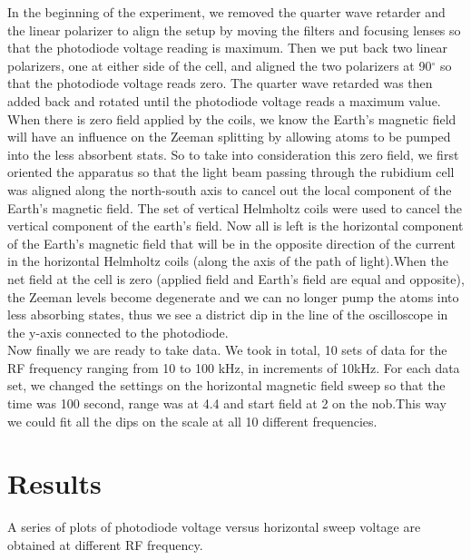 \documentclass[prb,preprint]{revtex4-1}
\begin{document}
In the beginning of the experiment, we removed the quarter wave retarder and the linear polarizer to align the setup by moving the filters and focusing lenses so that the photodiode voltage reading is maximum. Then we put back two linear polarizers, one at either side of the cell, and aligned the two polarizers at 90$^{\circ}$ so that the photodiode voltage reads zero. The quarter wave retarded was then added back and rotated until the photodiode voltage reads a maximum value.\\

When there is zero field applied by the coils, we know the Earth's magnetic field will have an influence on the Zeeman splitting by allowing atoms to be pumped into the less absorbent stats. So to take into consideration this zero field, we first oriented the apparatus so that the light beam passing through the rubidium cell was aligned along the north-south axis to cancel out the local component of the Earth's magnetic field. The set of vertical Helmholtz coils were used to cancel the vertical component of the earth's field. Now all is left is the horizontal component of the Earth's magnetic field that will be in the opposite direction of the current in the horizontal Helmholtz coils (along the axis of the path of light).When the net field at the cell is zero (applied field and Earth's field are equal and opposite), the Zeeman levels become degenerate and we can no longer pump the atoms into less absorbing states, thus we see a district dip in the line of the oscilloscope in the y-axis connected to the photodiode.\\

Now finally we are ready to take data. We took in total, 10 sets of data for the RF frequency ranging from 10 to 100 kHz, in increments of 10kHz. For each data set, we changed the settings on the horizontal magnetic field sweep so that the time was 100 second, range was at 4.4 and start field at 2 on the nob.This way we could fit all the dips on the scale at all 10 different frequencies.\\


\section{Results}

A series of plots of photodiode voltage versus horizontal sweep voltage are obtained at different RF frequency. \\
\end{document}
